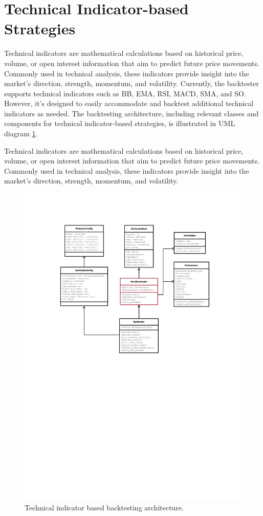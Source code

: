 \section{Technical Indicator-based Strategies}

Technical indicators are mathematical calculations based on historical price, volume, or open interest information that aim to predict future price movements.
Commonly used in technical analysis, these indicators provide insight into the market's direction, strength, momentum, and volatility.
Currently, the backtester supports technical indicators such as BB, EMA, RSI, MACD, SMA, and SO. However, it's designed to easily
accommodate and backtest additional technical indicators as needed.
The backtesting architecture, including relevant classes and components for technical indicator-based strategies, is illustrated in UML diagram \ref{fig:tech_indicator_arch}.

Technical indicators are mathematical calculations based on historical price, volume, or open interest information that aim to predict future price movements.
Commonly used in technical analysis, these indicators provide insight into the market's direction, strength, momentum, and volatility.
\noindent

\begin{figure}[ht!]
\centering
\includegraphics[page=1, trim=30mm 135mm 0 25mm, width=1.1\textwidth, clip]{./uml/backtester_uml.pdf}
\caption{Technical indicator based backtesting architecture.}
\label{fig:tech_indicator_arch}
\end{figure}

